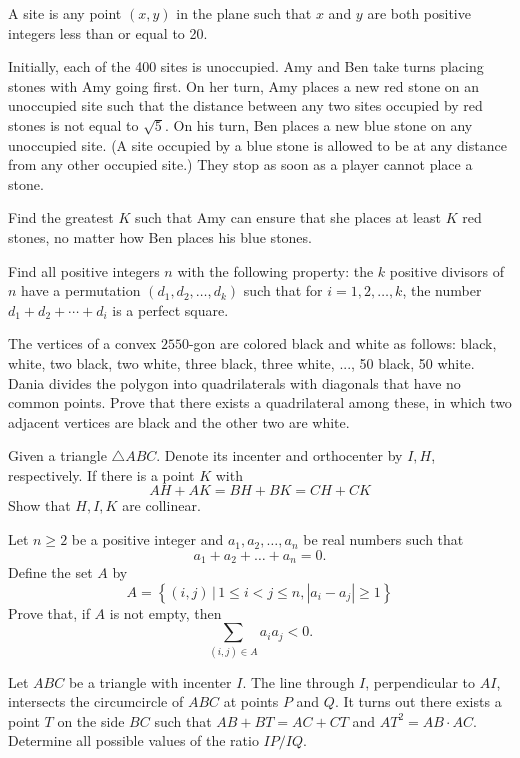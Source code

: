 \documentclass[11pt]{scrartcl}
\begin{document}
\begin{problem}[6246999615324043054]
	A site is any point $(x, y)$ in the plane such that $x$ and $y$ are both positive integers less than or equal to 20.

Initially, each of the 400 sites is unoccupied. Amy and Ben take turns placing stones with Amy going first. On her turn, Amy places a new red stone on an unoccupied site such that the distance between any two sites occupied by red stones is not equal to $\sqrt{5}$. On his turn, Ben places a new blue stone on any unoccupied site. (A site occupied by a blue stone is allowed to be at any distance from any other occupied site.) They stop as soon as a player cannot place a stone.

Find the greatest $K$ such that Amy can ensure that she places at least $K$ red stones, no matter how Ben places his blue stones.
\end{problem}
\begin{problem}[297274918587198]
	Find all positive integers $n$ with the following property: the $k$ positive divisors of $n$ have a permutation $(d_1,d_2,\ldots,d_k)$ such that for $i=1,2,\ldots,k$, the number $d_1+d_2+\cdots+d_i$ is a perfect square.
\end{problem}
\begin{problem}[5395714337110519657]
The vertices of a convex $2550$-gon are colored black and white as follows: black, white, two black, two white, three black, three white, ..., 50 black, 50 white. Dania divides the polygon into quadrilaterals with diagonals that have no common points. Prove that there exists a quadrilateral among these, in which two adjacent vertices are black and the other two are white.
\end{problem}
\begin{problem}[3906812380515301028]
Given a triangle $ \triangle ABC $. Denote its incenter and orthocenter by $ I, H $, respectively. If there is a point $ K $ with$$ AH+AK = BH+BK = CH+CK $$Show that $ H, I, K $ are collinear.
\end{problem}
\begin{problem}[781756252908608]
Let $n\geqslant 2$ be a positive integer and $a_1,a_2, \ldots ,a_n$ be real numbers such that\[a_1+a_2+\dots+a_n=0.\]Define the set $A$ by
\[A=\left\{(i, j)\,|\,1 \leqslant i<j \leqslant n,\left|a_{i}-a_{j}\right| \geqslant 1\right\}\]Prove that, if $A$ is not empty, then
\[\sum_{(i, j) \in A} a_{i} a_{j}<0.\]
\end{problem}
\begin{problem}[5363953658134647103]
Let $ABC$ be a triangle with incenter $I$. The line through $I$, perpendicular to $AI$, intersects the circumcircle of $ABC$ at points $P$ and $Q$. It turns out there exists a point $T$ on the side $BC$ such that $AB + BT = AC + CT$ and $AT^2 =  AB \cdot AC$. Determine all possible values of the ratio $IP/IQ$.
\end{problem}
\end{document}
